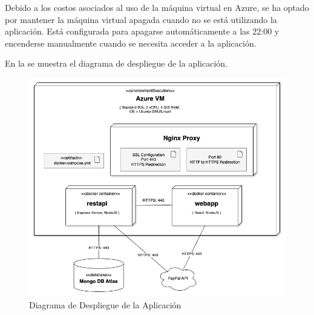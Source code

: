 Debido a los costos asociados al uso de la máquina virtual en Azure, se ha optado por mantener la máquina virtual apagada cuando no se está utilizando la aplicación.
Está configurada para apagarse automáticamente a las 22:00 y encenderse manualmente cuando se necesita acceder a la aplicación.


En la  se muestra el diagrama de despliegue de la aplicación.
\begin{figure}[H]
    \hypertarget{fig:6_6_Diagrama-Despliegue}{}
    \centering
    \includegraphics[width=0.8\linewidth]{figures/6-Analisis/6-Clases/6_5-Deployment.png}
    \caption{Diagrama de Despliegue de la Aplicación}
    \label{fig:6_6_Diagrama-Despliegue}
\end{figure}